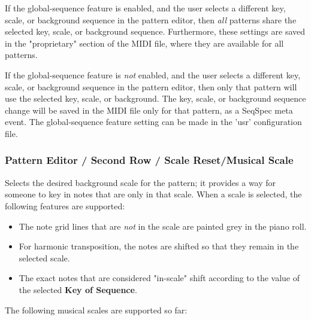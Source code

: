    If the global-sequence feature is enabled, and the user selects
   a different key, scale, or background sequence in the pattern editor, 
   then \textsl{all} patterns share the selected key, scale, or background
   sequence.  Furthermore, these settings are saved in the "proprietary"
   section of the MIDI file, where they are available for all patterns.

   If the global-sequence feature is \textsl{not} enabled, and the user selects
   a different key, scale, or background sequence in the pattern editor, 
   then only that pattern will use the selected key, scale, or background.
   The key, scale, or background sequence change will be saved in the MIDI file
   only for that pattern, as a SeqSpec meta event.
   The global-sequence feature setting can be made in the 'usr' configuration
   file.

\subsubsection{Pattern Editor / Second Row / Scale Reset/Musical Scale}
\label{subsubsec:pattern_editor_second_row_musical_scale}

   Selects the desired background scale for the pattern; it provides a way for
   someone to key in notes that are only in that scale.
   When a scale is selected, the following features are supported:

   \begin{itemize}
      \item The note grid lines that are \textsl{not}
         in the scale are painted grey in the piano roll.
      \item For harmonic transposition, the notes are shifted
         so that they remain in the selected scale.
      \item The exact notes that are considered "in-scale" shift according
         to the value of the selected \textbf{Key of Sequence}.
   \end{itemize}

   The following musical scales are supported so far:

